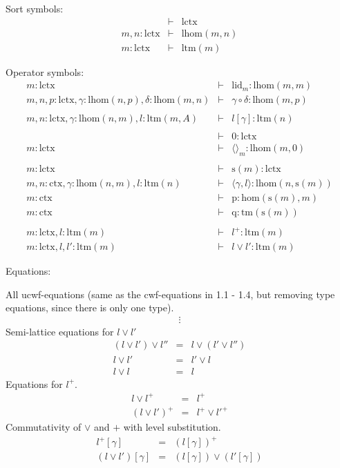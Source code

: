 \documentclass[11pt,a4paper]{article}
\theoremstyle{definition}
\def\lhom{\mathrm{lhom}}
\def\Hom{\mathrm{hom}}
\def\lHom{\mathrm{lhom}}
\def\lctx{\mathrm{lctx}}
\def\lty{\mathrm{level}}
\def\ltm{\mathrm{ltm}}
\def\lid{\mathrm{lid}}
\def\s{\mathrm{s}}
\newcommand{\ctx}{\mathrm{ctx}}
\newcommand{\tm}{\mathrm{tm}}
\newcommand{\tuple}[1]{\langle #1 \rangle}
\def\p{\mathrm{p}}
\def\q{\mathrm{q}}
\begin{document}
\begin{tiny}
Sort symbols:
\begin{eqnarray*}
&\vdash& \lctx\\
m, n : \lctx &\vdash& \lHom(m,n)\\
m : \lctx &\vdash& \ltm(m)
\end{eqnarray*}

Operator symbols:
\begin{eqnarray*}
m : \lctx &\vdash& \lid_m : \lhom(m,m)\\
m, n, p : \lctx, \gamma : \lhom(n,p), \delta : \lhom(m,n) &\vdash&
\gamma \circ \delta : \lhom(m,p)\\
&&\\
m,n: \lctx, \gamma : \lhom(n,m), l :\ltm(m,A) &\vdash&  l[\gamma] : \ltm(n)\\
&&\\
&\vdash& 0 : \lctx\\
m : \lctx &\vdash& \tuple{}_m : \lhom(m,0)\\
&&\\
m : \lctx &\vdash& \s(m) : \lctx\\
m,n : \ctx, \gamma : \lhom(n,m), l:\ltm(n) &\vdash& \tuple{\gamma,l} : \lhom(n,\s(m))\\
m : \ctx &\vdash& \p: \Hom(\s(m),m)\\
m : \ctx &\vdash& \q: \tm(\s(m))\\
&&\\
m : \lctx, l : \ltm(m) &\vdash& l^+ : \ltm(m)\\
m : \lctx, l,l' : \ltm(m) &\vdash& l \vee l' : \ltm(m)
\end{eqnarray*}
\end{tiny}
Equations:

\begin{tiny}
All ucwf-equations (same as the cwf-equations in 1.1 - 1.4, but removing type equations, since there is only one type).
\begin{eqnarray*}
&\vdots&
\end{eqnarray*}
Semi-lattice equations for $l \vee l'$
\begin{eqnarray*}
(l \vee l') \vee l'' &=& l \vee (l' \vee l'')\\
l \vee l' &=& l'\vee l\\
l \vee l &=& l
\end{eqnarray*}
Equations for $l^+$.
\begin{eqnarray*}
l \vee l^+ &=& l^+\\
(l\vee l')^+ &=& l^+\vee l'^+
\end{eqnarray*}
Commutativity of $\vee$ and $+$ with level substitution.
\begin{eqnarray*}
l^+[\gamma]&=&(l[\gamma])^+\\
(l \vee l')[\gamma]&=&(l[\gamma])\vee(l'[\gamma])
\end{eqnarray*}
\end{tiny}
\end{document}

